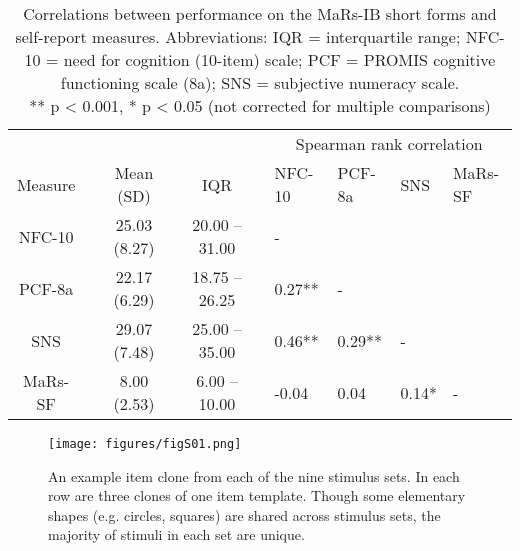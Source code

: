 \documentclass[a4paper,man,natbib]{apa6}
\begin{document}
\begin{table}
\centering
\begin{tabular*}{\textwidth}{ccccccllll}
\toprule
 & & & & & & \multicolumn{4}{c}{Spearman rank correlation} \\
\cmidrule(lr){7-10}
Measure & & Mean (SD) & & IQR & &  NFC-10 & PCF-8a & SNS & MaRs-SF \\
\midrule
NFC-10 & & 25.03 (8.27) & & 20.00 -- 31.00 & & - &  &  & \\
PCF-8a   &  & 22.17 (6.29) & & 18.75 -- 26.25 & & 0.27** &  - &  &  \\
SNS   &  & 29.07 (7.48) & & 25.00 -- 35.00 & & 0.46** &  0.29** &  - &   \\
MaRs-SF & &   8.00 (2.53) & &   6.00 -- 10.00 & & -0.04 &  0.04 &  0.14* &  - \\
\bottomrule
\end{tabular*}
\captionsetup{width=1.\textwidth}
\caption{\normalfont Correlations between performance on the MaRs-IB short forms and self-report measures. Abbreviations: IQR = interquartile range; NFC-10 = need for cognition (10-item) scale; PCF = PROMIS cognitive functioning scale (8a); SNS = subjective numeracy scale. \\ ** p < 0.001,  * p < 0.05 (not corrected for multiple comparisons)}
\end{table}

\begin{figure}
\centering
\texttt{[image: figures/figS01.png]}
\caption{\label{fig:figS01} An example item clone from each of the nine stimulus sets. In each row are three clones of one item template. Though some elementary shapes (e.g. circles, squares) are shared across stimulus sets, the majority of stimuli in each set are unique.}
\end{figure}
\end{document}
